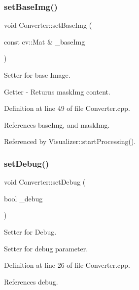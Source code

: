 \mbox{\label{class_converter_afc5aa4ae2b38f0dd8d9418ced905e69d}} 
\subsubsection{\texorpdfstring{setBaseImg()}{setBaseImg()}}
{\footnotesize\ttfamily void Converter\+::set\+Base\+Img (\begin{DoxyParamCaption}\item[{const cv\+::\+Mat \&}]{\+\_\+base\+Img }\end{DoxyParamCaption})}



Setter for base Image. 

Getter -\/ Returns \textquotesingle{}mask\+Img\textquotesingle{} content. 

Definition at line 49 of file Converter.\+cpp.



References base\+Img, and mask\+Img.



Referenced by Visualizer\+::start\+Processing().

\mbox{\label{class_converter_aad973b1f41c37039e66c33a60cf28e39}} 
\subsubsection{\texorpdfstring{setDebug()}{setDebug()}}
{\footnotesize\ttfamily void Converter\+::set\+Debug (\begin{DoxyParamCaption}\item[{bool}]{\+\_\+debug }\end{DoxyParamCaption})}



Setter for Debug. 

Setter for \textquotesingle{}debug\textquotesingle{} parameter. 

Definition at line 26 of file Converter.\+cpp.



References debug.

\mbox{\label{class_converter_a96069954f786607da376b96401815216}} 
